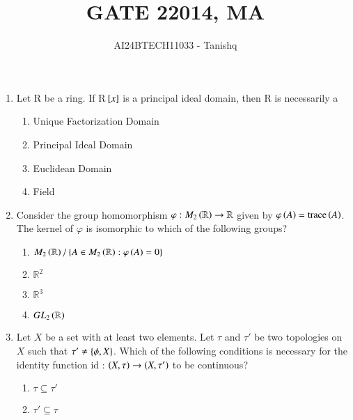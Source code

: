 \documentclass[journal]{IEEEtran}
\begin{document}

\vspace{3cm}
\author{AI24BTECH11033 - Tanishq}
\title{GATE 2}
{\let\newpage\relax\maketitle}
\title{2014, MA}
\renewcommand{\thefigure}{\theenumi}
\renewcommand{\thetable}{\theenumi}
\setlength{\intextsep}{10pt} %
\renewcommand{\thetable}{\theenumi}
\begin{enumerate}
  \item Let R be a ring. If R${}\left[x\right]$ is a principal ideal domain, then R is necessarily a
  \begin{enumerate}
      \item Unique Factorization Domain
      \item Principal Ideal Domain
      \item Euclidean Domain
      \item Field
  \end{enumerate}
  \item Consider the group homomorphism $\varphi : M_2\left(\mathbb{R}\right) \rightarrow \mathbb{R}$ given by $\varphi \left(A\right) = \text{trace}\left(A\right)$. The kernel of $\varphi$ is isomorphic to which of the following groups?
\begin{enumerate}
    \item $M_2\left(\mathbb{R}\right) / \left\{ A \in M_2\left(\mathbb{R}\right) : \varphi\left(A\right) = 0 \right\}$
    \item $\mathbb{R}^2$
    \item $\mathbb{R}^3$
    \item $GL_2\left(\mathbb{R}\right)$
\end{enumerate}
   \item Let $X$ be a set with at least two elements. Let $\tau$ and $\tau'$ be two topologies on $X$ such that $\tau' \neq  \left\{\phi , X\right\}$. Which of the following conditions is necessary for the identity function id : $\left(X , \tau\right) \rightarrow \left(X , \tau'\right)$ to be continuous? 
   \begin{enumerate}
      \item $\tau \subseteq \tau'$
      \item $\tau' \subseteq \tau$

\end{enumerate}
\end{enumerate}
\end{document}
